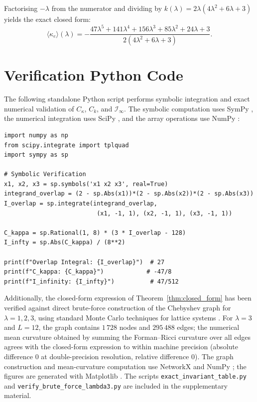 \documentclass[aps,pre,onecolumn,10pt,groupedaddress,amsmath,amssymb,floatfix]{revtex4-2}
\begin{document}
Factorising $-\lambda$ from the numerator and dividing by $k(\lambda) = 2\lambda(4\lambda^2+6\lambda+3)$ yields the exact closed form:
\[
\langle\kappa_e\rangle(\lambda) = -\frac{47\lambda^5 + 141\lambda^4 + 156\lambda^3 + 85\lambda^2 + 24\lambda + 3}{2(4\lambda^2 + 6\lambda + 3)}.
\]

\section{Verification Python Code}
\label{app:code}

The following standalone Python script performs symbolic integration and exact numerical validation of $C_\kappa$, $C_k$, and $\mathcal{I}_\infty$. The symbolic computation uses SymPy \cite{meurer2017sympy}, the numerical integration uses SciPy \cite{virtanen2020scipy}, and the array operations use NumPy \cite{harris2020numpy}:

\begin{verbatim}
import numpy as np
from scipy.integrate import tplquad
import sympy as sp

# Symbolic Verification
x1, x2, x3 = sp.symbols('x1 x2 x3', real=True)
integrand_overlap = (2 - sp.Abs(x1))*(2 - sp.Abs(x2))*(2 - sp.Abs(x3))
I_overlap = sp.integrate(integrand_overlap,
                          (x1, -1, 1), (x2, -1, 1), (x3, -1, 1))

C_kappa = sp.Rational(1, 8) * (3 * I_overlap - 128)
I_infty = sp.Abs(C_kappa) / (8**2)

print(f"Overlap Integral: {I_overlap}")  # 27
print(f"C_kappa: {C_kappa}")            # -47/8
print(f"I_infinity: {I_infty}")          # 47/512
\end{verbatim}

Additionally, the closed-form expression of Theorem~\ref{thm:closed_form} has been verified against direct brute-force construction of the Chebyshev graph for $\lambda = 1, 2, 3$, using standard Monte Carlo techniques for lattice systems \cite{metropolis1953equation}. For $\lambda = 3$ and $L = 12$, the graph contains $1\,728$ nodes and $295\,488$ edges; the numerical mean curvature obtained by summing the Forman--Ricci curvature over all edges agrees with the closed-form expression to within machine precision (absolute difference $0$ at double-precision resolution, relative difference $0$). The graph construction and mean-curvature computation use NetworkX \cite{hagberg2008networkx} and NumPy \cite{harris2020numpy}; the figures are generated with Matplotlib \cite{hunter2007matplotlib}. The scripts \texttt{exact\_invariant\_table.py} and \texttt{verify\_brute\_force\_lambda3.py} are included in the supplementary material.


\end{document}
